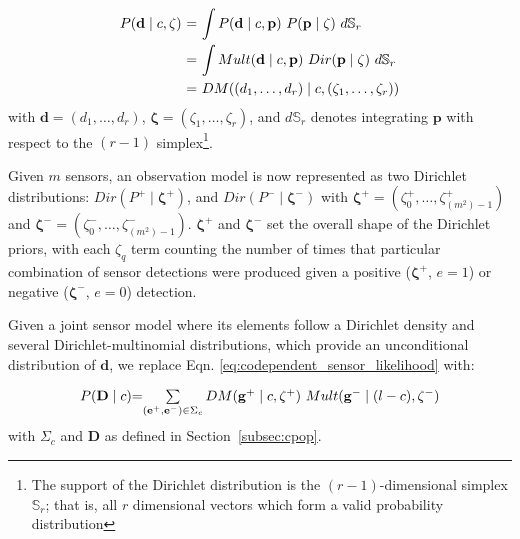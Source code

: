 \begin{equation}
	\label{eq:beta_binomial_revisit}
	\begin{tabular}{r@{ = }l}
        $P(\mathbf{d} \mid c, \mathbf{\zeta})$ & $\displaystyle\int P(\mathbf{d} \mid c, \mathbf{p}) ~ P(\mathbf{p} \mid \mathbf{\zeta}) ~d\mathbb S_r$ \\ [2ex]
        & $\displaystyle\int Mult(\mathbf{d} \mid c, \mathbf{p}) ~ Dir(\mathbf{p} \mid \mathbf{\zeta}) ~d\mathbb S_r$ \\ [2ex]
        & $DM((d_1, \ldots, d_r) \mid c, (\zeta_1, \ldots, \zeta_r))$
	\end{tabular}
\end{equation}
\noindent with $\mathbf{d} = (d_1, \ldots, d_r)$, $\mathbf{\zeta} = (\zeta_1, \ldots, \zeta_r)$, and $d\mathbb S_r$ denotes integrating $\mathbf{p}$ with respect to the $(r - 1)$ simplex\footnote{The support of the Dirichlet distribution is the $(r - 1)$-dimensional simplex $\mathbb S_r$; that is, all $r$ dimensional vectors which form a valid probability distribution}.

Given $m$ sensors, an observation model is now represented as two Dirichlet distributions: $Dir(P^+ \mid \mathbf{\zeta^+})$, and $Dir(P^- \mid \mathbf{\zeta^-})$ with $\mathbf{\zeta^+} = (\zeta^+_0, \ldots, \zeta^+_{(m^2)-1})$ and $\mathbf{\zeta^-} = (\zeta^-_0, \ldots, \zeta^-_{(m^2)-1})$. $\mathbf{\zeta^+}$ and $\mathbf{\zeta^-}$ set the overall shape of the Dirichlet priors, with each $\zeta_q$ term counting the number of times that particular combination of sensor detections were produced given a positive ($\mathbf{\zeta^+}$, $e=1$) or negative ($\mathbf{\zeta^-}$, $e=0$) detection.


Given a joint sensor model where its elements follow a Dirichlet density and several Dirichlet-multinomial distributions, which provide an unconditional distribution of $\mathbf{d}$, we replace Eqn. \ref{eq:codependent_sensor_likelihood} with:  

\begin{equation}
	\label{eq:joint_dirichlet_multinomial_distribution}
    \begin{tabular}{r@{=}l}
		$P(\mathbf{D} \mid c)$ & $\sum\limits_{(\mathbf{e}^+, \mathbf{e}^-) \in \Sigma_c} DM(\mathbf{g}^+ \mid c, \mathbf{\zeta^+}) ~ Mult(\mathbf{g}^- \mid (l - c), \mathbf{\zeta^-})$
	\end{tabular}
\end{equation}
\noindent with $\Sigma_c$ and $\mathbf{D}$ as defined in Section~\ref{subsec:cpop}.


